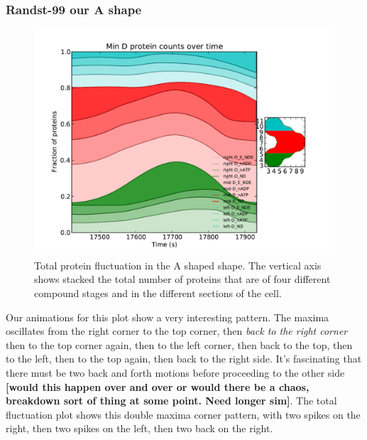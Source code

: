 \documentclass[letterpaper,twocolumn,amsmath,amssymb,pre]{revtex4-1}
\newcommand{\red}[1]{{\bf \color{red} #1}}
\newcommand{\fixme}[1]{\red{[#1]}}
\begin{document}
\subsubsection{Randst-99 our A shape}
\begin{figure}
  \includegraphics[width=\columnwidth]{../data/shape-randst/plots/box-plot_D--randst-25-600-600-9900-1500}
  \caption{Total protein fluctuation in the A shaped shape.  The vertical axis shows stacked the total number
    of proteins that are of four different compound stages and in the
    different sections of the cell.}
  \label{total-oscillation-randst-96-plot}
\end{figure}
Our animations for this plot show a very interesting pattern.  The
maxima oscillates from the right corner to the top corner, then
\emph{back to the right corner} then to the top corner again, then to
the left corner, then back to the top, then to the left, then to the
top again, then back to the right side.  It's fascinating that there
must be two back and forth motions before proceeding to the other side
\fixme{would this happen over and over or would there be a chaos,
  breakdown sort of thing at some point.  Need longer sim}.  The total
fluctuation plot shows this double maxima corner pattern, with two
spikes on the right, then two spikes on the left, then two back on the
right.
\end{document}
